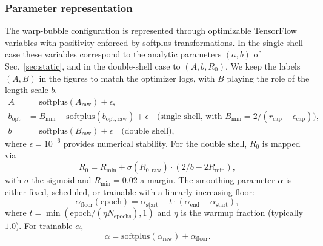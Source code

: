\documentclass[11pt]{article}
\begin{document}
\subsubsection{Parameter representation}
The warp-bubble configuration is represented through optimizable TensorFlow variables with positivity enforced by softplus transformations. In the single-shell case these variables correspond to the analytic parameters $(a,b)$ of Sec.~\ref{sec:static}, and in the double-shell case to $(A,b,R_0)$. We keep the labels $(A,B)$ in the figures to match the optimizer logs, with $B$ playing the role of the length scale $b$.
\begin{align}
A &= \mathrm{softplus}(A_{\text{raw}}) + \epsilon, \\
b_{\mathrm{opt}} &= B_{\min} + \mathrm{softplus}(b_{\mathrm{opt,raw}}) + \epsilon \quad \text{(single shell, with } B_{\min} = 2 / (r_{\text{cap}} - \epsilon_{\text{cap}})\text{)}, \\
b &= \mathrm{softplus}(B_{\text{raw}}) + \epsilon \quad \text{(double shell)},
\end{align}
where $\epsilon = 10^{-6}$ provides numerical stability. For the double shell, $R_0$ is mapped via
\[
R_0 = R_{\min} + \sigma(R_{0,\text{raw}}) \cdot (2/b - 2R_{\min}),
\]
with $\sigma$ the sigmoid and $R_{\min} = 0.02$ a margin. The smoothing parameter $\alpha$ is either fixed, scheduled, or trainable with a linearly increasing floor:
\[
\alpha_{\text{floor}}(\text{epoch}) = \alpha_{\text{start}} + t \cdot (\alpha_{\text{end}} - \alpha_{\text{start}}),
\]
where $t = \min(\text{epoch} / (\eta N_{\text{epochs}}), 1)$ and $\eta$ is the warmup fraction (typically $1.0$). For trainable $\alpha$,
\[
\alpha = \mathrm{softplus}(\alpha_{\text{raw}}) + \alpha_{\text{floor}}.
\]
\end{document}
